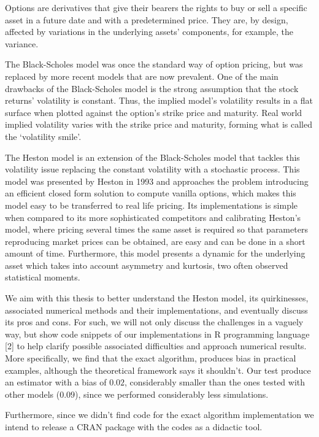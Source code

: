 \documentclass[12pt,twoside]{reedthesis}
\theoremstyle{definition}
\theoremstyle{definition}
\theoremstyle{remark}
\begin{document}
  Options are derivatives that give their bearers the rights to buy or
  sell a specific asset in a future date and with a predetermined price.
  They are, by design, affected by variations in the underlying assets'
  components, for example, the variance.
  
  The Black-Scholes model was once the standard way of option pricing, but
  was replaced by more recent models that are now prevalent. One of the
  main drawbacks of the Black-Scholes model is the strong assumption that
  the stock returns' volatility is constant. Thus, the implied model's
  volatility results in a flat surface when plotted against the option's
  strike price and maturity. Real world implied volatility varies with the
  strike price and maturity, forming what is called the `volatility
  smile'.
  
  The Heston model is an extension of the Black-Scholes model that tackles
  this volatility issue replacing the constant volatility with a
  stochastic process. This model was presented by Heston in 1993 and
  approaches the problem introducing an efficient closed form solution to
  compute vanilla options, which makes this model easy to be transferred
  to real life pricing. Its implementations is simple when compared to its
  more sophisticated competitors and calibrating Heston's model, where
  pricing several times the same asset is required so that parameters
  reproducing market prices can be obtained, are easy and can be done in a
  short amount of time. Furthermore, this model presents a dynamic for the
  underlying asset which takes into account asymmetry and kurtosis, two
  often observed statistical moments.
  
  We aim with this thesis to better understand the Heston model, its
  quirkinesses, associated numerical methods and their implementations,
  and eventually discuss its pros and cons. For such, we will not only
  discuss the challenges in a vaguely way, but show code snippets of our
  implementations in R programming language {[}2{]} to help clarify
  possible associated difficulties and approach numerical results. More
  specifically, we find that the exact algorithm, produces bias in
  practical examples, although the theoretical framework says it
  shouldn't. Our test produce an estimator with a bias of \(0.02\),
  considerably smaller than the ones tested with other models (\(0.09\)),
  since we performed considerably less simulations.
  
  Furthermore, since we didn't find code for the exact algorithm
  implementation we intend to release a CRAN package with the codes as a
  didactic tool.
  
\end{document}
